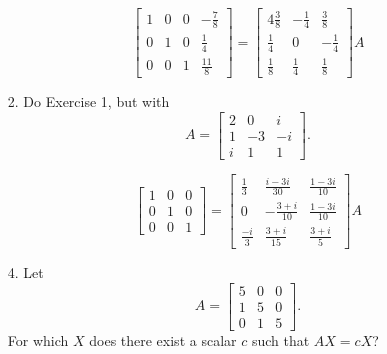 \documentclass{article}
\begin{document}
\begin{enumerate}[listparindent=\parindent]
\[
    \boxed {
        \begin{bmatrix}
            1 & 0 & 0 & -\frac{7}{8} \\
            0 & 1 & 0 & \frac{1}{4} \\
            0 & 0 & 1 & \frac{11}{8}
        \end{bmatrix}
        =
        \begin{bmatrix}{4}
            \frac{3}{8} & -\frac{1}{4} & \frac{3}{8} \\
            \frac{1}{4} & 0 & -\frac{1}{4} \\
            \frac{1}{8} & \frac{1}{4} & \frac{1}{8}
        \end{bmatrix}
        A
    }
\]

\item[2.] Do Exercise 1, but with
    \[
        A = \begin{bmatrix}
            2 & 0 & i \\
            1 & -3 & -i \\
            i & 1 & 1
        \end{bmatrix}.
    \]

\[
    \boxed {
        \begin{bmatrix}
            1 & 0 & 0 \\
            0 & 1 & 0 \\
            0 & 0 & 1
        \end{bmatrix}
        =
        \begin{bmatrix}
            \frac{1}{3} & \frac{i-3i}{30} & \frac{1-3i}{10} \\
            0 & -\frac{3+i}{10} & \frac{1-3i}{10} \\
            \frac{-i}{3} & \frac{3+i}{15} & \frac{3+i}{5}
        \end{bmatrix}
        A
    }
\]

\item[4.] Let
    \[
        A = \begin{bmatrix}
            5 & 0 & 0 \\
            1 & 5 & 0 \\
            0 & 1 & 5
        \end{bmatrix}.
    \]
    For which \(X\) does there exist a scalar \(c\) such that \(AX = cX\)?


\end{enumerate}
\end{document}
